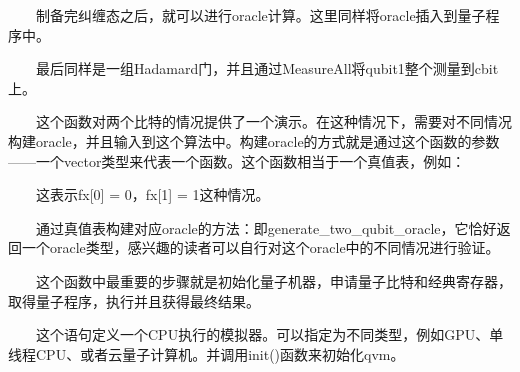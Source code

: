 \documentclass[a4paper,11pt,english]{sphinxmanual}
\begin{document}
\sphinxAtStartPar
  制备完纠缠态之后，就可以进行oracle计算。这里同样将oracle插入到量子程序中。

\begin{sphinxVerbatim}[commandchars=\\\{\}]
      
\end{sphinxVerbatim}

\sphinxAtStartPar
  最后同样是一组Hadamard门，并且通过MeasureAll将qubit1整个测量到cbit上。

\sphinxAtStartPar
{}

\sphinxAtStartPar
  这个函数对两个比特的情况提供了一个演示。在这种情况下，需要对不同情况构建oracle，并且输入到这个算法中。构建oracle的方式就是通过这个函数的参数——一个vector类型来代表一个函数。这个函数相当于一个真值表，例如：

\begin{sphinxVerbatim}[commandchars=\\\{\}]
    
\end{sphinxVerbatim}

\sphinxAtStartPar
  这表示fx{[}0{]} = 0，fx{[}1{]} = 1这种情况。

\sphinxAtStartPar
  通过真值表构建对应oracle的方法：即generate\_two\_qubit\_oracle，它恰好返回一个oracle类型，感兴趣的读者可以自行对这个oracle中的不同情况进行验证。

\sphinxAtStartPar
  这个函数中最重要的步骤就是初始化量子机器，申请量子比特和经典寄存器，取得量子程序，执行并且获得最终结果。

\begin{sphinxVerbatim}[commandchars=\\\{\}]
   
\end{sphinxVerbatim}

\sphinxAtStartPar
  这个语句定义一个CPU执行的模拟器。可以指定为不同类型，例如GPU、单线程CPU、或者云量子计算机。并调用init()函数来初始化qvm。
\end{document}
